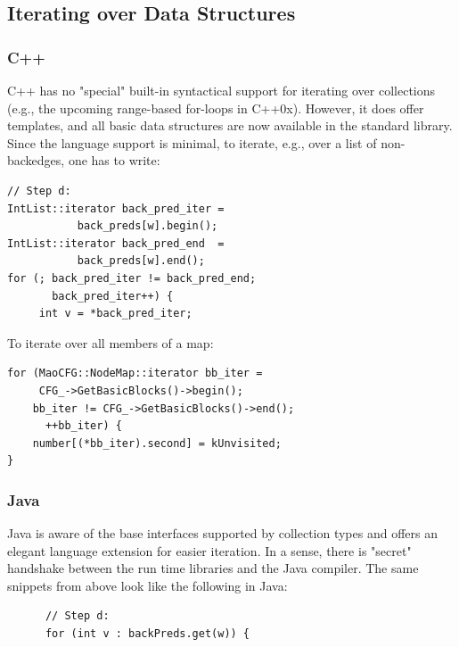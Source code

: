 
\subsection{Iterating over Data Structures}

\subsubsection{C++}

C++ has no "special" built-in syntactical support for iterating over
collections (e.g., the upcoming range-based for-loops in
C++0x). However, it does offer templates, and all basic data
structures are now available in the standard library. Since the
language support is minimal, to iterate, e.g., over a list of
non-backedges, one has to write:

\begin{footnotesize}
\begin{verbatim}
// Step d:
IntList::iterator back_pred_iter = 
           back_preds[w].begin();
IntList::iterator back_pred_end  = 
           back_preds[w].end();
for (; back_pred_iter != back_pred_end; 
       back_pred_iter++) {
     int v = *back_pred_iter;
\end{verbatim}
\end{footnotesize}

To iterate over all members of a map:

\begin{footnotesize}
\begin{verbatim}
for (MaoCFG::NodeMap::iterator bb_iter =
     CFG_->GetBasicBlocks()->begin();
    bb_iter != CFG_->GetBasicBlocks()->end(); 
      ++bb_iter) {
    number[(*bb_iter).second] = kUnvisited;
}
\end{verbatim}
\end{footnotesize}

\subsubsection{Java}

Java is aware of the base interfaces supported by collection types and
 offers an elegant language extension for easier iteration. In a
 sense, there is "secret" handshake between the run time libraries and
 the Java compiler. The same snippets from above look like the following in
 Java:

\begin{footnotesize}
\begin{verbatim}
      // Step d:
      for (int v : backPreds.get(w)) {
\end{verbatim}
\end{footnotesize}

